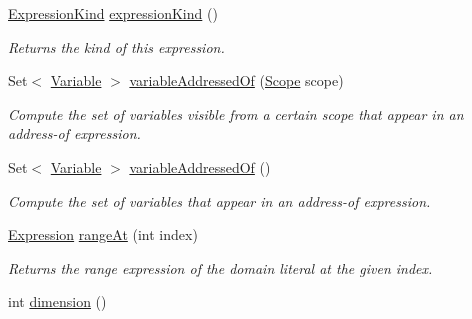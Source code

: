 \begin{DoxyCompactItemize}
\item 
\hyperlink{enumedu_1_1udel_1_1cis_1_1vsl_1_1civl_1_1model_1_1IF_1_1expression_1_1Expression_1_1ExpressionKind}{Expression\+Kind} \hyperlink{classedu_1_1udel_1_1cis_1_1vsl_1_1civl_1_1model_1_1common_1_1expression_1_1CommonRecDomainLiteralExpression_acfd02c50bb7fe8927396765b3c345e30}{expression\+Kind} ()
\begin{DoxyCompactList}\small\item\em Returns the kind of this expression. \end{DoxyCompactList}\item 
Set$<$ \hyperlink{interfaceedu_1_1udel_1_1cis_1_1vsl_1_1civl_1_1model_1_1IF_1_1variable_1_1Variable}{Variable} $>$ \hyperlink{classedu_1_1udel_1_1cis_1_1vsl_1_1civl_1_1model_1_1common_1_1expression_1_1CommonRecDomainLiteralExpression_af8d199ad571b6e5746ca2ee78c04b693}{variable\+Addressed\+Of} (\hyperlink{interfaceedu_1_1udel_1_1cis_1_1vsl_1_1civl_1_1model_1_1IF_1_1Scope}{Scope} scope)
\begin{DoxyCompactList}\small\item\em Compute the set of variables visible from a certain scope that appear in an address-\/of expression. \end{DoxyCompactList}\item 
Set$<$ \hyperlink{interfaceedu_1_1udel_1_1cis_1_1vsl_1_1civl_1_1model_1_1IF_1_1variable_1_1Variable}{Variable} $>$ \hyperlink{classedu_1_1udel_1_1cis_1_1vsl_1_1civl_1_1model_1_1common_1_1expression_1_1CommonRecDomainLiteralExpression_a4ffb340bf1038887dd671b68a74ce113}{variable\+Addressed\+Of} ()
\begin{DoxyCompactList}\small\item\em Compute the set of variables that appear in an address-\/of expression. \end{DoxyCompactList}\item 
\hyperlink{interfaceedu_1_1udel_1_1cis_1_1vsl_1_1civl_1_1model_1_1IF_1_1expression_1_1Expression}{Expression} \hyperlink{classedu_1_1udel_1_1cis_1_1vsl_1_1civl_1_1model_1_1common_1_1expression_1_1CommonRecDomainLiteralExpression_a85243df5241a7191be411554257e788e}{range\+At} (int index)
\begin{DoxyCompactList}\small\item\em Returns the range expression of the domain literal at the given index. \end{DoxyCompactList}\item 
int \hyperlink{classedu_1_1udel_1_1cis_1_1vsl_1_1civl_1_1model_1_1common_1_1expression_1_1CommonRecDomainLiteralExpression_aad3f2bf6215dc2a204199ad2362f2775}{dimension} ()

\end{DoxyCompactItemize}
